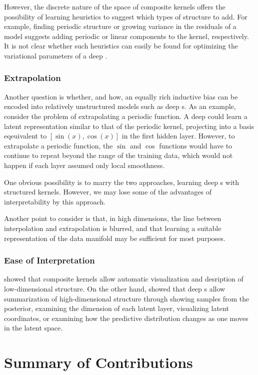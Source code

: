However, the discrete nature of the space of composite kernels offers the possibility of learning heuristics to suggest which types of structure to add.
For example, finding periodic structure or growing variance in the residuals of a model suggests adding periodic or linear components to the kernel, respectively.
It is not clear whether such heuristics can easily be found for optimizing the variational parameters of a deep \gp{}.

\subsubsection{Extrapolation}
Another question is whether, and how, an equally rich inductive bias can be encoded into relatively unstructured models such as deep \gp{}s.
As an example, consider the problem of extrapolating a periodic function.
A deep \gp{} could learn a latent representation similar to that of the periodic kernel, projecting into a basis eqeuivalent to $[\sin(x), \cos(x)]$ in the first hidden layer.
However, to extrapolate a periodic function, the $\sin$ and $\cos$ functions would have to continue to repeat beyond the range of the training data, which would not happen if each layer assumed only local smoothness.

One obvious possibility is to marry the two approaches, learning deep \gp{}s with structured kernels.
However, we may lose some of the advantages of interpretability by this approach.

Another point to consider is that, in high dimensions, the line between interpolation and extrapolation is blurred, and that learning a suitable representation of the data manifold may be sufficient for most purposes.

\subsubsection{Ease of Interpretation}
 showed that composite kernels allow automatic visualization and desription of low-dimensional structure.
On the other hand, \citet{damianou2012deep} showed that deep \gplvm{}s allow summarization of high-dimensional structure through showing samples from the posterior, examining the dimension of each latent layer, visualizing latent coordinates, or examining how the predictive distribution changes as one moves in the latent space.




\section{Summary of Contributions}

